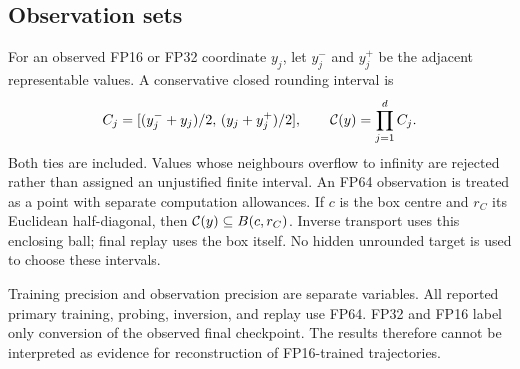 \subsection{Observation sets}
For an observed FP16 or FP32 coordinate $y_j$, let $y_j^-$ and $y_j^+$ be the adjacent representable values. A conservative closed rounding interval is
\begin{equation}\label{eq:cell}
 C_j=[(y_j^-+y_j)/2,\,(y_j+y_j^+)/2],\qquad
 \mathcal{C}(y)=\prod_{j=1}^d C_j.
\end{equation}
Both ties are included. Values whose neighbours overflow to infinity are rejected rather than assigned an unjustified finite interval. An FP64 observation is treated as a point with separate computation allowances. If $c$ is the box centre and $r_C$ its Euclidean half-diagonal, then $\mathcal{C}(y)\subseteq B(c,r_C)$. Inverse transport uses this enclosing ball; final replay uses the box itself. No hidden unrounded target is used to choose these intervals.

Training precision and observation precision are separate variables. All reported primary training, probing, inversion, and replay use FP64. FP32 and FP16 label only conversion of the observed final checkpoint. The results therefore cannot be interpreted as evidence for reconstruction of FP16-trained trajectories.

